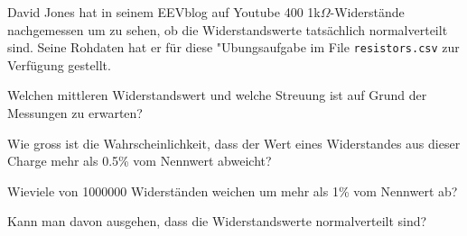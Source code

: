 David Jones hat in seinem EEVblog auf Youtube 400 1k$\Omega$-Widerstände
nachgemessen um zu sehen, ob die Widerstandswerte tatsächlich normalverteilt
sind. Seine Rohdaten hat er für diese "Ubungsaufgabe im File
\verb+resistors.csv+ zur Verfügung gestellt.
\begin{teilaufgaben}
\item Welchen mittleren Widerstandswert und welche Streuung ist auf Grund
der Messungen zu erwarten?
\item Wie gross ist die Wahrscheinlichkeit, dass der Wert eines Widerstandes
aus dieser Charge mehr als 0.5\% vom Nennwert abweicht?
\item Wieviele von 1000000 Widerständen weichen um mehr als 1\% vom
Nennwert ab?
\item Kann man davon ausgehen, dass die Widerstandswerte normalverteilt sind?
\end{teilaufgaben}


